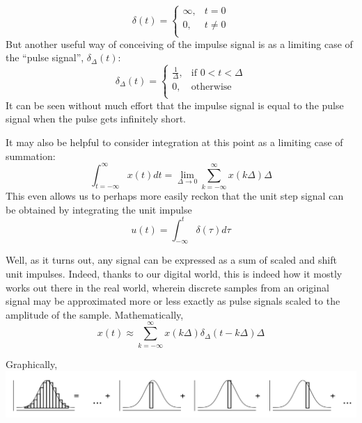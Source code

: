 \documentclass[11pt]{book}
\begin{document}
\begin{equation}
	\delta(t) = \begin{cases} 
      \infty, & t = 0\\
      0, & t \neq 0\\
   \end{cases}
\end{equation}
But another useful way of conceiving of the impulse signal is as a limiting case of the ``pulse signal'', $\delta_{\Delta}(t)$:
\begin{equation}
	\delta_{\Delta}(t) = \begin{cases} 
      \frac{1}{\Delta}, & \text{if } 0< t < \Delta \\
      0, & \text{otherwise }\\
   \end{cases}
\end{equation}
It can be seen without much effort that the impulse signal is equal to the pulse signal when the pulse gets infinitely short.

It may also be helpful to consider integration at this point as a limiting case of summation:
\begin{equation}
	\int_{t = -\infty}^{\infty}x(t)dt = \lim_{\Delta\rightarrow 0}\sum_{k=-\infty}^{\infty}x(k\Delta)\Delta
\end{equation}
This even allows us to perhaps more easily reckon that the unit step signal can be obtained by integrating the unit impulse
\begin{equation}
	u(t) = \int_{-\infty}^{t}\delta(\tau)d\tau
\end{equation}

Well, as it turns out, any signal can be expressed as a sum of scaled and shift unit impulses. Indeed, thanks to our digital world, this is indeed how it mostly works out there in the real world, wherein discrete samples from an original signal may be approximated more or less exactly as pulse signals scaled to the amplitude of the sample. Mathematically,
\begin{equation}
	x(t) \approx \sum_{k=-\infty}^{\infty}x(k\Delta)\delta_{\Delta}(t-k\Delta)\Delta
\end{equation} 

Graphically,
\includegraphics[width=\textwidth]{figures/13.01.png}
\end{document}
